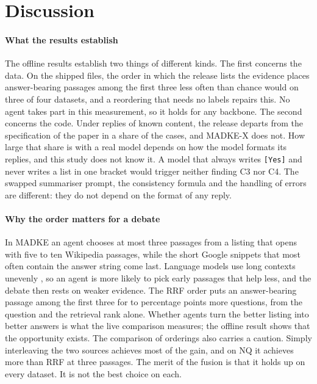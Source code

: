 \section{Discussion}
\label{sec:discussion}

\paragraph{What the results establish}
The offline results establish two things of different kinds. The first concerns the data. On the shipped files, the order in which the release lists the evidence places answer-bearing passages among the first three less often than chance would on three of four datasets, and a reordering that needs no labels repairs this. No agent takes part in this measurement, so it holds for any backbone. The second concerns the code. Under replies of known content, the release departs from the specification of the paper in a share of the cases, and MADKE-X does not. How large that share is with a real model depends on how the model formats its replies, and this study does not know it. A model that always writes \texttt{[Yes]} and never writes a list in one bracket would trigger neither finding C3 nor C4. The swapped summariser prompt, the consistency formula and the handling of errors are different: they do not depend on the format of any reply.

\paragraph{Why the order matters for a debate}
In MADKE an agent chooses at most three passages from a listing that opens with five to ten Wikipedia passages, while the short Google snippets that most often contain the answer string come last. Language models use long contexts unevenly \cite{liu2024lost}, so an agent is more likely to pick early passages that help less, and the debate then rests on weaker evidence. The RRF order puts an answer-bearing passage among the first three for \VGainMin{} to \VGainMax{} percentage points more questions, from the question and the retrieval rank alone. Whether agents turn the better listing into better answers is what the live comparison measures; the offline result shows that the opportunity exists. The comparison of orderings also carries a caution. Simply interleaving the two sources achieves most of the gain, and on NQ it achieves more than RRF at three passages. The merit of the fusion is that it holds up on every dataset. It is not the best choice on each.


